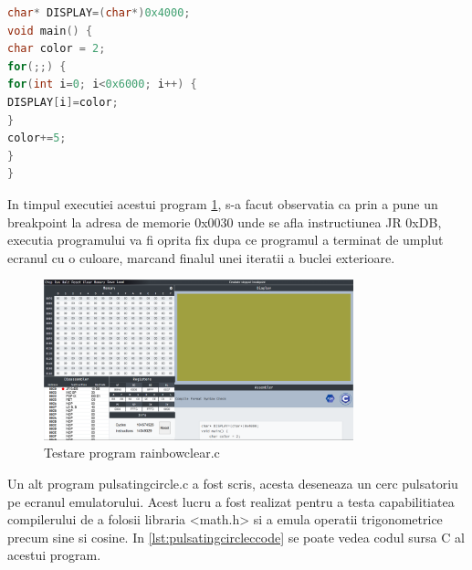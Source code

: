 \documentclass[titlepage,12pt]{article}
\DeclareRobustCommand{\code}[1]{{\ttfamily\small #1}}
\begin{document}
\begin{lstlisting}[language=C,caption={Cod sursa C pentru \code{rainbowclear.c}},label={lst:rainbowclearccode}]
char* DISPLAY=(char*)0x4000;
void main() {
char color = 2;
for(;;) {
for(int i=0; i<0x6000; i++) {
DISPLAY[i]=color;
}
color+=5;
}
}
\end{lstlisting}

In timpul executiei acestui program \cref{fig:rainbowtestrun}, s-a facut observatia ca prin a pune un breakpoint la adresa de memorie \code{0x0030} unde se afla instructiunea \code{JR 0xDB}, executia programului va fi oprita fix dupa ce programul a terminat de umplut ecranul cu o culoare, marcand finalul unei iteratii a buclei exterioare.

\begin{figure}[H]
\centering
\includegraphics[width=0.8\textwidth]{images/rainbowtestrun.png}
\caption{Testare program \code{rainbowclear.c}}
\label{fig:rainbowtestrun}
\end{figure}

Un alt program \code{pulsatingcircle.c} a fost scris, acesta deseneaza un cerc pulsatoriu pe ecranul emulatorului. Acest lucru a fost realizat pentru a testa capabilitiatea compilerului de a folosii libraria \code{<math.h>} si a emula operatii trigonometrice precum \code{sine} si \code{cosine}. In \cref{lst:pulsatingcircleccode} se poate vedea codul sursa C al acestui program.
\end{document}
